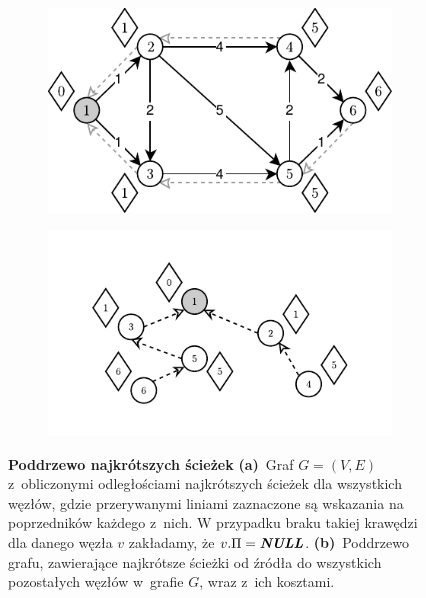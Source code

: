 \begin{figure}[!htbp]
	\centering
	\null\hfill
	\begin{subfigure}[b]{0.49\textwidth}
		\includegraphics[width=\textwidth]{Chapter_I/SHORTEST-PATH-SUBTREE-Example/a.pdf}
		\caption{}
		\label{fig:shortestPathTree:a}
	\end{subfigure}
	\hfill
	\begin{subfigure}[b]{0.49\textwidth}
		\includegraphics[width=\textwidth]{Chapter_I/SHORTEST-PATH-SUBTREE-Example/b.pdf}
		\caption{}
		\label{fig:shortestPathTree:b}
	\end{subfigure}
	\hfill\null
	\caption{\textbf{Poddrzewo najkrótszych ścieżek}
		\textbf{(a)}~Graf $G = \left( V, E \right)$ z~obliczonymi odległościami najkrótszych ścieżek dla wszystkich węzłów, gdzie przerywanymi liniami zaznaczone są wskazania na poprzedników każdego z~nich.
		W przypadku braku takiej krawędzi dla danego węzła $v$ zakładamy, że $v.\Pi = \emph{\textbf{NULL}}$.
		\textbf{(b)}~Poddrzewo grafu, zawierające najkrótsze ścieżki od źródła do wszystkich pozostałych węzłów w~grafie $G$, wraz z~ich kosztami.
	}
	\label{fig:shortestPathTree}
\end{figure}

